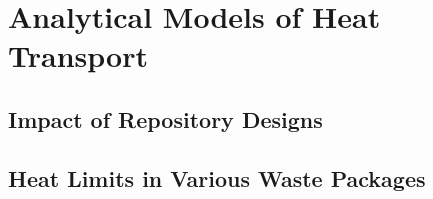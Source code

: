 







\section{Analytical Models of Heat Transport}
\label{sec:analytical_heat}


\subsection{Impact of Repository Designs}

\subsection{Heat Limits in Various Waste Packages}



